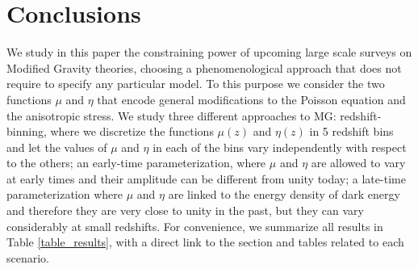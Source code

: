 \section{Conclusions}



We study in this paper the constraining power of upcoming large scale surveys on Modified Gravity theories, choosing a phenomenological approach that does not require to specify any particular model. To this purpose we consider the two functions $\mu$ and $\eta$ that encode general modifications to the Poisson equation and the anisotropic stress.
We study three different approaches to MG: redshift-binning, where we discretize the functions $\mu(z)$ and $\eta(z)$ in 5 redshift bins and 
let the values of $\mu$ and $\eta$ in each of the bins vary independently with respect to the others; an early-time parameterization, where $\mu$ and $\eta$ are allowed to vary at early times and their amplitude
can be different from unity today; a late-time parameterization where  $\mu$ and $\eta$ are linked to the energy density of dark energy and therefore they are very
close to unity in the past, but they can vary considerably at small redshifts. For convenience, we summarize all results in Table \ref{table_results}, with a direct link to the section and tables related to each scenario.

